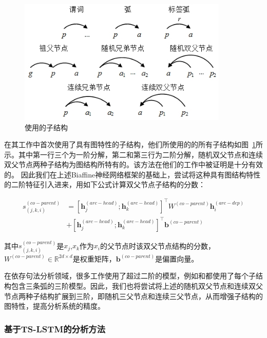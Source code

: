 \begin{figure}[hbtp]
	\centering
	\includegraphics[width=100mm]{picture/parts.jpg}
	\caption{使用的子结构}
	\label{fig:parts}
\end{figure}

在其工作中首次使用了具有图特性的子结构，他们所使用的的所有子结构如图~\ref{fig:parts}所示。其中第一行三个为一阶分解，第二和第三行为二阶分解，随机双父节点和连续双父节点两种子结构为图结构所特有的。该方法在他们的工作中被证明是十分有效的。
因此我们在上述Biaffine神经网络框架的基础上，尝试将这种具有图结构特性的二阶特征引入进来，用如下公式计算双父节点子结构的分数：

\begin{equation}
\begin{split}
s^{(co-parent)}_{(j,k,i)} & = [\mathbf{h}^{(arc-head)}_j;\mathbf{h}^{(arc-head)}_k]^{\top}W^{(co-parent)}\mathbf{h}^{(arc-dep)}_i \\
& + [\mathbf{h}^{(arc-head)}_j;\mathbf{h}^{(arc-head)}_k]^{\top}\mathbf{b}^{(co-parent)}
\end{split}
\end{equation}

其中$s^{(co-parent)}_{(j,k,i)}$是$x_j$,$x_k$作为$x_i$的父节点时该双父节点结构的分数，$W^{(co-parent)} \in \mathbb{R}^{2d \times d}$是权重矩阵，$\mathbf{b}^{(co-parent)}$是偏置向量。

在依存句法分析领域，很多工作使用了超过二阶的模型，例如和都使用了每个子结构包含三条弧的三阶模型。因此，我们也将尝试将上述的随机双父节点和连续双父节点两种子结构扩展到三阶，即随机三父节点和连续三父节点，从而增强子结构的图特性，提高分析系统的精度。

\subsubsection{基于TS-LSTM的分析方法}


